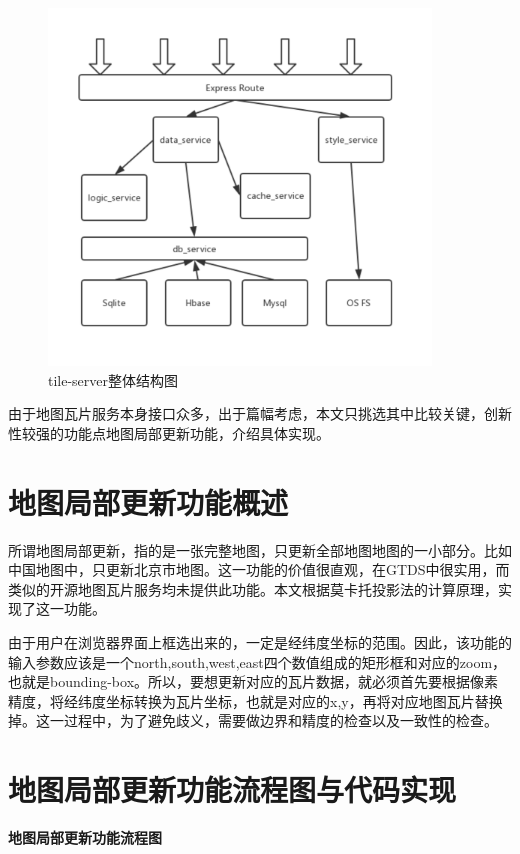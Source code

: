 \begin{figure}[H]
  \centering
  \includegraphics[width=4in]{new_FIGs/chapter4/tile-server-structure.pdf}
  \caption{tile-server整体结构图}\label{tile-server-structure}
\end{figure}

由于地图瓦片服务本身接口众多，出于篇幅考虑，本文只挑选其中比较关键，创新性较强的功能点地图局部更新功能，介绍具体实现。
\section{地图局部更新功能概述}
所谓地图局部更新，指的是一张完整地图，只更新全部地图地图的一小部分。比如中国地图中，只更新北京市地图。这一功能的价值很直观，在GTDS中很实用，而类似的开源地图瓦片服务均未提供此功能。本文根据莫卡托投影法的计算原理，实现了这一功能。

由于用户在浏览器界面上框选出来的，一定是经纬度坐标的范围。因此，该功能的输入参数应该是一个north,south,west,east四个数值组成的矩形框和对应的zoom，也就是bounding-box。所以，要想更新对应的瓦片数据，就必须首先要根据像素精度，将经纬度坐标转换为瓦片坐标，也就是对应的x,y，再将对应地图瓦片替换掉。这一过程中，为了避免歧义，需要做边界和精度的检查以及一致性的检查。
\section{地图局部更新功能流程图与代码实现}
\textbf{地图局部更新功能流程图}

